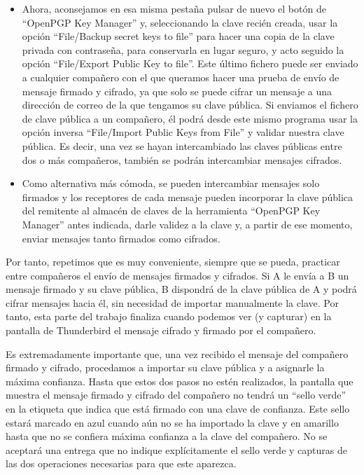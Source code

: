 \begin{itemize}[label=\textbullet]
    \item Ahora, aconsejamos en esa misma pestaña pulsar de nuevo el botón de ``OpenPGP Key Manager''
    y, seleccionando la clave recién creada, usar la opción ``File/Backup secret keys to file'' para hacer una
    copia de la clave privada con contraseña, para conservarla en lugar seguro, y acto seguido la opción
    ``File/Export Public Key to file''. Este último fichero puede ser enviado a cualquier compañero con el que
    queramos hacer una prueba de envío de mensaje firmado y cifrado, ya que solo se puede cifrar un mensaje
    a una dirección de correo de la que tengamos su clave pública. Si enviamos el fichero de clave pública a
    un compañero, él podrá desde este mismo programa usar la opción inversa
    ``File/Import Public Keys from File'' y validar nuestra clave pública. Es decir, una vez se hayan
    intercambiado las claves públicas entre dos o más compañeros, también se podrán intercambiar mensajes
    cifrados.

    \item Como alternativa más cómoda, se pueden intercambiar mensajes solo firmados y los receptores de
    cada mensaje pueden incorporar la clave pública del remitente al almacén de claves de la herramienta
    ``OpenPGP Key Manager'' antes indicada, darle validez a la clave y, a partir de ese momento, enviar
    mensajes tanto firmados como cifrados.
\end{itemize}

Por tanto, repetimos que es muy conveniente, siempre que se pueda, practicar entre compañeros el envío
de mensajes firmados y cifrados. Si A le envía a B un mensaje firmado y su clave pública, B dispondrá de
la clave pública de A y podrá cifrar mensajes hacia él, sin necesidad de importar manualmente la clave.
Por tanto, esta parte del trabajo finaliza cuando podemos ver (y capturar) en la pantalla de Thunderbird
el mensaje cifrado y firmado por el compañero.

Es extremadamente importante que, una vez recibido el mensaje del compañero firmado y cifrado,
procedamos a importar su clave pública y a asignarle la máxima confianza. Hasta que estos dos pasos no
estén realizados, la pantalla que muestra el mensaje firmado y cifrado del compañero no tendrá un
``sello verde'' en la etiqueta que indica que está firmado con una clave de confianza. Este sello estará
marcado en azul cuando aún no se ha importado la clave y en amarillo hasta que no se confiera máxima
confianza a la clave del compañero. No se aceptará una entrega que no indique explícitamente el sello
verde y capturas de las dos operaciones necesarias para que este aparezca.

